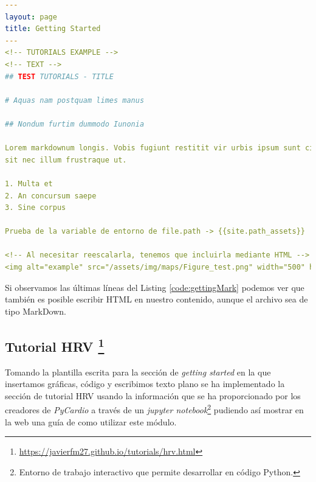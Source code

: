 \begin{lstlisting}[language=yaml,caption=getting\_started.md,label={code:gettingMark}]
  ---
layout: page
title: Getting Started
---
<!-- TUTORIALS EXAMPLE -->
<!-- TEXT -->
## TEST TUTORIALS - TITLE

# Aquas nam postquam limes manus

## Nondum furtim dummodo Iunonia

Lorem markdownum longis. Vobis fugiunt restitit vir urbis ipsum sunt circuiere
sit nec illum frustraque ut.

1. Multa et
2. An concursum saepe
3. Sine corpus

Prueba de la variable de entorno de file.path -> {{site.path_assets}}

<!-- Al necesitar reescalarla, tenemos que incluirla mediante HTML -->
<img alt="example" src="/assets/img/maps/Figure_test.png" width="500" height="200">
\end{lstlisting}

Si observamos las  últimas líneas del Listing \ref{code:gettingMark} podemos ver que también es posible escribir HTML en nuestro contenido, aunque el archivo sea de tipo MarkDown.

\subsection[Tutorial HRV]{Tutorial HRV \footnote{\url{https://javierfm27.github.io/tutorials/hrv.html}}}
Tomando la plantilla escrita para la sección de \textit{getting started} en la que insertamos gráficas, código y escribimos texto plano se ha implementado la sección de tutorial HRV usando la información que se ha proporcionado por los creadores de \textit{PyCardio} a través de un \textit{jupyter notebook}\footnote{Entorno de trabajo interactivo que permite desarrollar en código Python.} pudiendo así mostrar en la web una guía de como utilizar este módulo. 


